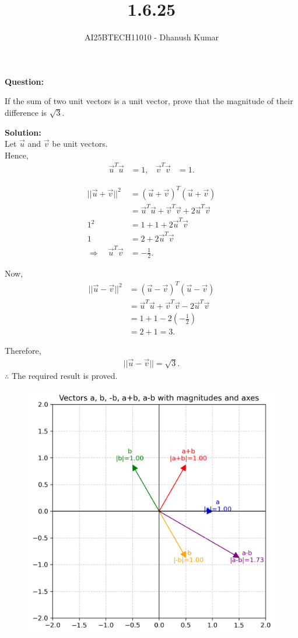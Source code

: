\documentclass[journal]{IEEEtran}
\begin{document}
\title{1.6.25}
\author{AI25BTECH11010 - Dhanush Kumar}
\maketitle
\renewcommand{\thefigure}{\theenumi}
\renewcommand{\thetable}{\theenumi}

\noindent
\noindent\textbf{Question:} 

If the sum of two unit vectors is a unit vector, prove that the magnitude of their difference is $\sqrt{3}$.

\bigskip
\noindent\textbf{Solution:} \\


Let 
	$\vec{u}$ and $\vec{v}$ be unit vectors.\\
	Hence,
\begin{align}
	\vec{u}^T \vec{u} &= 1, & \vec{v}^T \vec{v} &= 1.
\end{align}

\medskip

\begin{align}
||\vec{u}+\vec{v}||^2 &= (\vec{u}+\vec{v})^T(\vec{u}+\vec{v}) \\
&= \vec{u}^T\vec{u} + \vec{v}^T\vec{v} + 2\vec{u}^T\vec{v} \\
1^2 &= 1 + 1 + 2\vec{u}^T\vec{v} \\
1 &= 2 + 2\vec{u}^T\vec{v} \\
\Rightarrow \quad \vec{u}^T\vec{v} &= -\tfrac{1}{2}.
\end{align}

\medskip

Now,  
\begin{align}
||\vec{u}-\vec{v}||^2 &= (\vec{u}-\vec{v})^T(\vec{u}-\vec{v}) \\
&= \vec{u}^T\vec{u} + \vec{v}^T\vec{v} - 2\vec{u}^T\vec{v} \\
&= 1 + 1 - 2\left(-\tfrac{1}{2}\right) \\
&= 2 + 1 = 3.
\end{align}

Therefore,  
\begin{align}
||\vec{u}-\vec{v}|| = \sqrt{3}.
\end{align}
\noindent\(\therefore\) The required result is proved.
\begin{figure}[H]
  \centering
   \includegraphics[width=0.7\linewidth]{../figs/vectors_plot.png}
   \caption{}
  \label{stemplot}
\end{figure}
\end{document}

